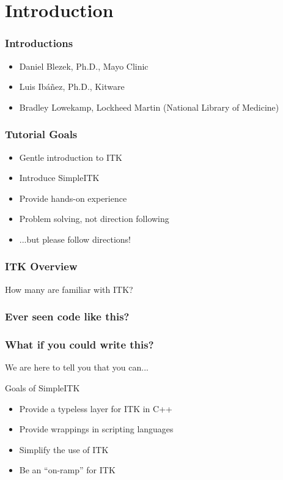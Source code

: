 \section{Introduction}

\begin{frame}
\frametitle{Introductions}

\begin{itemize}
\item Daniel Blezek, Ph.D., Mayo Clinic
\item Luis Ib\'a\~nez, Ph.D., Kitware
\item Bradley Lowekamp, Lockheed Martin (National Library of Medicine)
\end{itemize}

\end{frame}

\begin{frame}
\frametitle{Tutorial Goals}
\begin{itemize}
\item Gentle introduction to ITK
\item Introduce SimpleITK
\item Provide hands-on experience
\item Problem solving, not direction following
\item ...but please follow directions!
\end{itemize}
\end{frame}

\begin{frame}
\frametitle{ITK Overview}
How many are familiar with ITK?
\end{frame}

\begin{frame}
\frametitle{Ever seen code like this?}
\begin{center}
\lstcpp

\end{center}
\end{frame}

\begin{frame}
\frametitle{What if you could write this?}
\begin{center}
\lstpython

\end{center}
\pause
We are here to tell you that you can...
\end{frame}

\begin{frame}{Goals of SimpleITK}
\begin{itemize}
\item Provide a typeless layer for ITK in C++
\item Provide wrappings in scripting languages
\item Simplify the use of ITK
\item Be an ``on-ramp'' for ITK
\end{itemize}
\end{frame}

